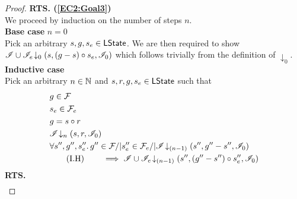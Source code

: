 \begin{lemma}
\begin{proof}
\noindent\textbf{RTS. (\ref{EC2:Goal3})} \\
We proceed by induction on the number of steps $n$.\\

\noindent\textbf{Base case }$n=0$\\
Pick an arbitrary $s, g, s_e \in \textsf{LState}$. We are then required to show	$\mathscr{I} \cup \mathscr{I}_e \!\downarrow_{0} \left(s, (g-s) \circ s_e, \mathscr{I}_0\right)$ which follows trivially from the definition of $\downarrow_0$.\\


\noindent\textbf{Inductive case }\\
Pick an arbitrary $n \in \mathbb{N}$ and $s, r, g, s_e \in \textsf{LState}$ such that
%
\begin{align}
	& g \in \mathcal{F}_{} \label{LEC2:Ass1}\\
	& s_e \in \mathcal{F}_{e} \label{LEC2:Ass2}\\
	& g = s \circ r \label{LEC2:Ass3} \\
	& \mathscr{I} \!\downarrow_{n} \left(s, r, \mathscr{I}_0\right) \label{LEC2:Ass4}\\
	& \forall s'', g'', s_e''.\,  g'' \in \mathcal{F}_{} /| s''_e \in \mathcal{F}_{e} /| \mathscr{I} \!\downarrow_{(n-1)} \left(s'', g''-s'', \mathscr{I}_0\right) \nonumber \\
	& \tag{I.H} \qquad \implies \mathscr{I} \cup \mathscr{I}_{e} \!\downarrow_{(n-1)} \left(s'', (g''-s'') \circ s_e'', \mathscr{I}_{0}\right) \label{LEC2:IH}
\end{align}
%
\textbf{RTS.}
%
\begin{align*}
%  

\end{align*}
\end{proof}
\end{lemma}
